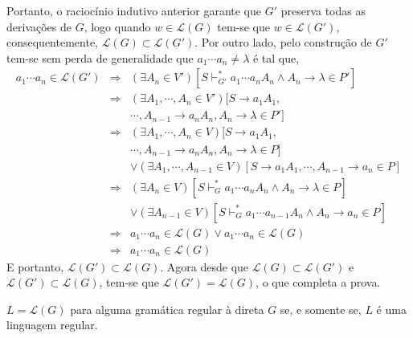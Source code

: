 \begin{prova}
\begin{itemize}
	\end{itemize}
	Portanto, o raciocínio indutivo anterior garante que $G'$ preserva todas as derivações de $G$, logo quando $w \in \mathcal{L}(G)$ tem-se que $w \in \mathcal{L}(G')$, consequentemente,  $ \mathcal{L}(G) \subset \mathcal{L}(G')$. Por outro lado, pelo construção de $G'$ tem-se sem perda de generalidade que $a_1\cdots a_n \neq \lambda$ é tal que,
	\begin{eqnarray*}
		a_1\cdots a_n \in \mathcal{L}(G') & \Rightarrow &  (\exists A_{n} \in V')[S \vdash_{G'}^* a_1\cdots a_{n}A_n \land A_n \rightarrow \lambda \in P']\\
		& \Rightarrow & (\exists A_1, \cdots, A_{n} \in V')[S \rightarrow a_1A_1, \\
		& & \cdots, A_{n-1} \rightarrow a_nA_n, A_n \rightarrow \lambda \in P']\\
		& \Rightarrow & (\exists A_1, \cdots, A_{n} \in V)[S \rightarrow a_1A_1,\\
		& &  \cdots, A_{n-1} \rightarrow a_nA_n, A_n \rightarrow \lambda \in P]\\
		& & \lor  (\exists A_1, \cdots, A_{n-1} \in V)[S \rightarrow a_1A_1, \cdots, A_{n-1} \rightarrow a_{n} \in P]\\
		& \Rightarrow &  (\exists A_{n} \in V)[S \vdash_{G}^* a_1\cdots a_{n}A_n \land A_n \rightarrow \lambda \in P]\\
		& & \lor (\exists A_{n-1} \in V)[S \vdash_{G}^* a_1\cdots a_{n-1}A_n \land A_n \rightarrow a_n \in P]\\
		& \Rightarrow & a_1\cdots a_n \in \mathcal{L}(G) \lor a_1\cdots a_n \in \mathcal{L}(G)\\
		& \Rightarrow & a_1\cdots a_n \in \mathcal{L}(G)
	\end{eqnarray*}
	E portanto, $\mathcal{L}(G') \subset \mathcal{L}(G)$. Agora desde que $ \mathcal{L}(G) \subset \mathcal{L}(G')$ e $\mathcal{L}(G') \subset \mathcal{L}(G)$, tem-se que $\mathcal{L}(G') = \mathcal{L}(G)$, o que completa a prova.
\end{prova}

\begin{teorema}\label{teo:GRD-AFD}
	$L = \mathcal{L}(G)$ para alguma gramática regular à direta $G$ se, e somente se, $L$ é uma linguagem regular.
\end{teorema}

